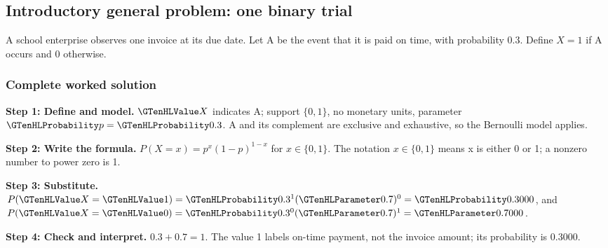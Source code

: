 \subsection{Introductory general problem: one binary trial}\label{prob:c3-binary}
A school enterprise observes one invoice at its due date. Let A be the event that it is paid on time, with probability 0.3. Define $X=1$ if A occurs and 0 otherwise.


\subsubsection*{Complete worked solution}\label{sol:c3-binary}
\par\noindent\begin{minipage}{\linewidth}
\textbf{Step 1: Define and model.} $\Indicator{X}$ indicates A; support $\{0,1\}$, no monetary units, parameter $\SuccessProb{p}=\SuccessProb{0.3}$. A and its complement are exclusive and exhaustive, so the Bernoulli model applies.
\end{minipage}\par\medskip
\par\noindent\begin{minipage}{\linewidth}
\textbf{Step 2: Write the formula.} $P(X=x)=p^x(1-p)^{1-x}$ for $x\in\{0,1\}$. The notation $x\in\{0,1\}$ means x is either 0 or 1; a nonzero number to power zero is 1.
\end{minipage}\par\medskip
\par\noindent\begin{minipage}{\linewidth}
\textbf{Step 3: Substitute.} $P(\Indicator{X}=\Indicator{1})=\SuccessProb{0.3}^1(\FailureProb{0.7})^0=\SuccessProb{0.3000}$, and $P(\Indicator{X}=\Indicator{0})=\SuccessProb{0.3}^0(\FailureProb{0.7})^1=\FailureProb{0.7000}$.
\end{minipage}\par\medskip
\par\noindent\begin{minipage}{\linewidth}
\textbf{Step 4: Check and interpret.} $0.3+0.7=1$. The value 1 labels on-time payment, not the invoice amount; its probability is 0.3000.
\end{minipage}\par\medskip

